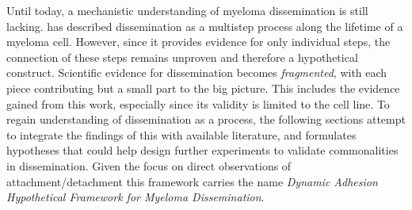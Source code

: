 



%
\label{sec:discussion_framework}%
Until today, a mechanistic understanding of myeloma dissemination is still
lacking. \citet{zeissigTumourDisseminationMultiple2020} has described
dissemination as a multistep process along the lifetime of a myeloma cell.
However, since it provides evidence for only individual steps, the connection of these steps remains unproven and
therefore a hypothetical construct. Scientific evidence for dissemination
becomes \emph{fragmented}, with each piece contributing but a small part to the
big picture. This includes the evidence gained from this work, especially since
its validity is limited to the \INA cell line. To regain understanding of
dissemination as a process, the following sections attempt to integrate the
findings of this with available literature, and formulates hypotheses that could
help design further experiments to validate commonalities in dissemination.
Given the focus on direct observations of attachment/detachment
this framework carries the name \emph{Dynamic
      Adhesion Hypothetical Framework for Myeloma Dissemination}.
      
